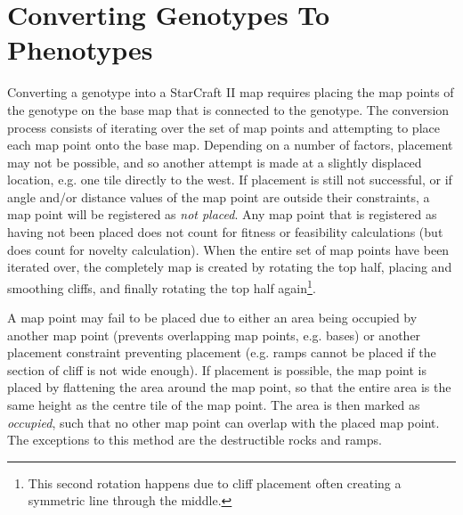 \section{Converting Genotypes To Phenotypes}
\label{methodology_conversion}
Converting a genotype into a StarCraft II map requires placing the map points of the genotype on the base map that is connected to the genotype. The conversion process consists of iterating over the set of map points and attempting to place each map point onto the base map. Depending on a number of factors, placement may not be possible, and so another attempt is made at a slightly displaced location, e.g. one tile directly to the west. If placement is still not successful, or if angle and/or distance values of the map point are outside their constraints, a map point will be registered as \textit{not placed}. Any map point that is registered as having not been placed does not count for fitness or feasibility calculations (but does count for novelty calculation). When the entire set of map points have been iterated over, the completely map is created by rotating the top half, placing and smoothing cliffs, and finally rotating the top half again\footnote{This second rotation happens due to cliff placement often creating a symmetric line through the middle.}. 

A map point may fail to be placed due to either an area being occupied by another map point (prevents overlapping map points, e.g. bases) or another placement constraint preventing placement (e.g. ramps cannot be placed if the section of cliff is not wide enough). If placement is possible, the map point is placed by flattening the area around the map point, so that the entire area is the same height as the centre tile of the map point. The area is then marked as \textit{occupied}, such that no other map point can overlap with the placed map point. The exceptions to this method are the destructible rocks and ramps. 

